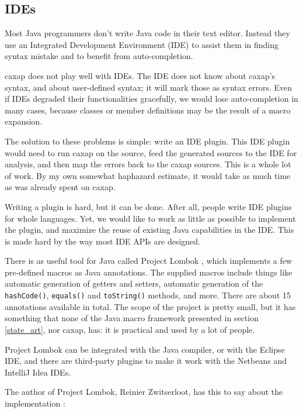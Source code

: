 \subsection{IDEs}

Most Java programmers don't write Java code in their text editor. Instead they
use an Integrated Development Environment (IDE) to assist them in finding syntax
mistake and to benefit from auto-completion.

caxap does not play well with IDEs. The IDE does not know about caxap's syntax,
and about user-defined syntax; it will mark those as syntax errors. Even if IDEs
degraded their functionalities gracefully, we would lose auto-completion in many
cases, because classes or member definitions may be the result of a macro
expansion.

The solution to these problems is simple: write an IDE plugin. This IDE plugin
would need to run caxap on the source, feed the generated sources to the IDE for
analysis, and then map the errors back to the caxap sources. This is a whole lot
of work. By my own somewhat haphazard estimate, it would take as much time as
was already spent on caxap.

Writing a plugin is hard, but it can be done. After all, people write IDE
plugins for whole languages. Yet, we would like to work as little as possible to
implement the plugin, and maximize the reuse of existing Java capabilities in
the IDE. This is made hard by the way most IDE APIs are designed.

There is as useful tool for Java called Project Lombok \cite{lombok}, which
implements a few pre-defined macros as Java annotations. The supplied macros
include things like automatic generation of getters and setters, automatic
generation of the \texttt{hashCode()}, \texttt{equals()} and \texttt{toString()}
methods, and more. There are about 15 annotations available in total. The scope
of the project is pretty small, but it has something that none of the Java macro
framework presented in section \ref{state_art}, nor caxap, has: it is practical
and used by a lot of people.

Project Lombok can be integrated with the Java compiler, or with the Eclipse
IDE, and there are third-party plugins to make it work with the Netbeans and
IntelliJ Idea IDEs.

The author of Project Lombok, Reinier Zwitserloot, has this to say about the
implementation \cite{lombok}:

